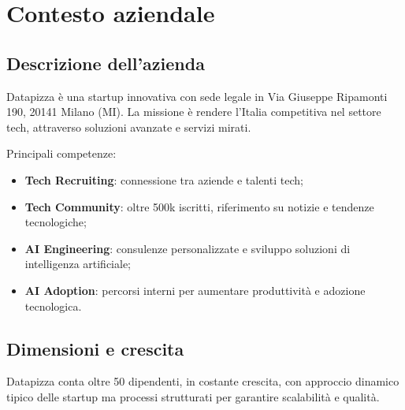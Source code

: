 \chapter{Contesto aziendale}
\section{Descrizione dell'azienda}
Datapizza è una startup innovativa con sede legale in Via Giuseppe Ripamonti 190, 20141 Milano (MI).  
La missione è rendere l'Italia competitiva nel settore tech, attraverso soluzioni avanzate e servizi mirati.  

Principali competenze:
\begin{itemize}
  \item \textbf{Tech Recruiting}: connessione tra aziende e talenti tech;
  \item \textbf{Tech Community}: oltre 500k iscritti, riferimento su notizie e tendenze tecnologiche;
  \item \textbf{AI Engineering}: consulenze personalizzate e sviluppo soluzioni di intelligenza artificiale;
  \item \textbf{AI Adoption}: percorsi interni per aumentare produttività e adozione tecnologica.
\end{itemize}

\section{Dimensioni e crescita}
Datapizza conta oltre 50 dipendenti, in costante crescita, con approccio dinamico tipico delle startup ma processi strutturati per garantire scalabilità e qualità.